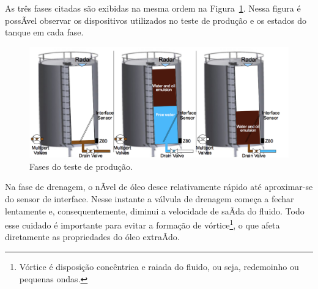 \documentclass[11pt]{article} %
\begin{document}
As três fases citadas são exibidas na mesma ordem na Figura~\ref{fig:EstudoDeCaso}. Nessa figura é
possÃ­vel observar os dispositivos utilizados no teste de produção e os estados do tanque
em cada fase.

\begin{figure}[h] \centering \includegraphics[width=1.\textwidth]{images/FasesEstudoDeCaso.png}
\caption{Fases do teste de produção.}
\label{fig:EstudoDeCaso}
\end{figure}

Na fase de drenagem, o nÃ­vel de óleo desce relativamente rápido até aproximar-se do sensor de interface.
Nesse instante a válvula de drenagem começa a fechar lentamente e, consequentemente, diminui a
velocidade de  saÃ­da do fluido. Todo esse cuidado é importante para evitar a formação de vórtice\footnote{Vórtice
é disposição concêntrica e raiada do fluido, ou seja, redemoinho ou pequenas
ondas.}, o que afeta diretamente as propriedades do óleo extraÃ­do.




\end{document}
